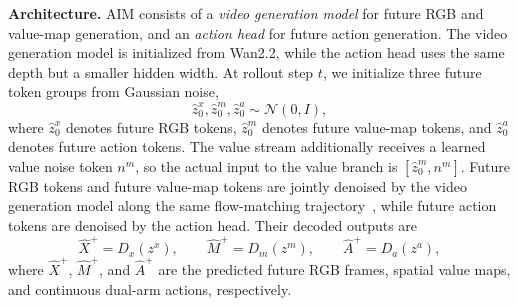 \documentclass{article}
\newcommand{\method}{AIM\xspace}
\begin{document}
\noindent\textbf{Architecture.} \method consists of a \emph{video generation model} for future RGB and value-map generation, and an \emph{action head} for future action generation. The video generation model is initialized from Wan2.2, while the action head uses the same depth but a smaller hidden width. At rollout step $t$, we initialize three future token groups from Gaussian noise,
\begin{equation}
\hat{z}_{0}^{x}, \hat{z}_{0}^{m}, \hat{z}_{0}^{a} \sim \mathcal{N}(0, I),
\end{equation}
where $\hat{z}_{0}^{x}$ denotes future RGB tokens, $\hat{z}_{0}^{m}$ denotes future value-map tokens, and $\hat{z}_{0}^{a}$ denotes future action tokens. The value stream additionally receives a learned value noise token $n^{m}$, so the actual input to the value branch is $[\hat{z}_{0}^{m}, n^m]$. Future RGB tokens and future value-map tokens are jointly denoised by the video generation model along the same flow-matching trajectory~\cite{lipman2023flowmatching}, while future action tokens are denoised by the action head. Their decoded outputs are
\begin{equation}
\hat{X}^{+} = D_x(z^{x}), \qquad
\hat{M}^{+} = D_m(z^{m}), \qquad
\hat{A}^{+} = D_a(z^{a}),
\end{equation}
where $\hat{X}^{+}$, $\hat{M}^{+}$, and $\hat{A}^{+}$ are the predicted future RGB frames, spatial value maps, and continuous dual-arm actions, respectively.
\end{document}
